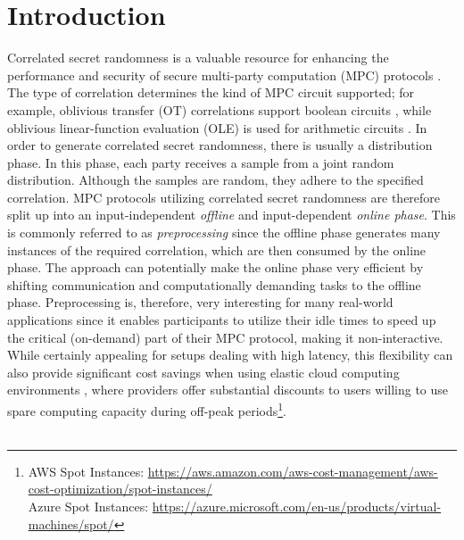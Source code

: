 \chapter{Introduction}
Correlated secret randomness is a valuable resource for enhancing the performance and security of secure multi-party computation (MPC) protocols \cite{ishai2013power}. The type of correlation determines the kind of MPC circuit supported; for example, oblivious transfer (OT) correlations support boolean circuits \cite{goldreich2019play}, while oblivious linear-function evaluation (OLE) is used for arithmetic circuits \cite{ishai2009secure}. In order to generate correlated secret randomness, there is usually a distribution phase. In this phase, each party receives a sample from a joint random distribution. Although the samples are random, they adhere to the specified correlation. MPC protocols utilizing correlated secret randomness are therefore split up into an input-independent \textit{offline} and input-dependent \textit{online phase}. This is commonly referred to as \textit{preprocessing} since the offline phase generates many instances of the required correlation, which are then consumed by the online phase. The approach can potentially make the online phase very efficient by shifting communication and computationally demanding tasks to the offline phase. Preprocessing is, therefore, very interesting for many real-world applications since it enables participants to utilize their idle times to speed up the critical (on-demand) part of their MPC protocol, making it non-interactive. While certainly appealing for setups dealing with high latency, this flexibility can also provide significant cost savings when using elastic cloud computing environments \cite{coutinho2015elasticity}, where providers offer substantial discounts to users willing to use spare computing capacity during off-peak periods\footnote{AWS Spot Instances: \url{https://aws.amazon.com/aws-cost-management/aws-cost-optimization/spot-instances/} \\ Azure Spot Instances: \url{https://azure.microsoft.com/en-us/products/virtual-machines/spot/}}.
\\\\

